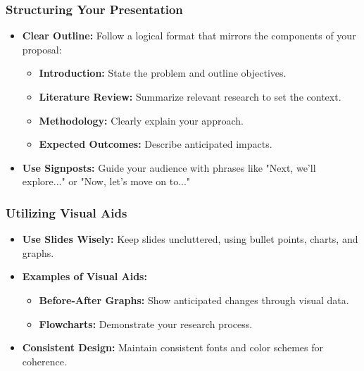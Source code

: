 \documentclass[aspectratio=169]{beamer}
\begin{document}
\begin{frame}[fragile]
    \frametitle{Structuring Your Presentation}
    \begin{itemize}
        \item \textbf{Clear Outline:} Follow a logical format that mirrors the components of your proposal:
            \begin{itemize}
                \item \textbf{Introduction:} State the problem and outline objectives.
                \item \textbf{Literature Review:} Summarize relevant research to set the context.
                \item \textbf{Methodology:} Clearly explain your approach.
                \item \textbf{Expected Outcomes:} Describe anticipated impacts.
            \end{itemize}
        \item \textbf{Use Signposts:} Guide your audience with phrases like "Next, we'll explore..." or "Now, let's move on to..."
    \end{itemize}
\end{frame}

\begin{frame}[fragile]
    \frametitle{Utilizing Visual Aids}
    \begin{itemize}
        \item \textbf{Use Slides Wisely:} Keep slides uncluttered, using bullet points, charts, and graphs.
        \item \textbf{Examples of Visual Aids:}
            \begin{itemize}
                \item \textbf{Before-After Graphs:} Show anticipated changes through visual data.
                \item \textbf{Flowcharts:} Demonstrate your research process.
            \end{itemize}
        \item \textbf{Consistent Design:} Maintain consistent fonts and color schemes for coherence.
    \end{itemize}
\end{frame}
\end{document}
